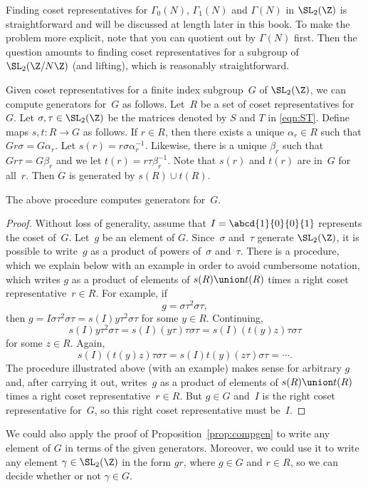 Finding coset representatives for $\Gamma_0(N)$, $\Gamma_1(N)$ and
$\Gamma(N)$ in $\SL_2(\Z)$ is straightforward and will be discussed
at length later in this book. To make the problem more explicit, note
that you can quotient out by $\Gamma(N)$ first. Then the question
amounts to finding coset representatives for a subgroup of
$\SL_2(\Z/N\Z)$ (and lifting), which is reasonably straightforward.

Given coset representatives for a finite index subgroup~$G$ of
$\SL_2(\Z)$, we can compute generators for~$G$ as follows.  Let~$R$ be
a set of coset representatives for $G$.  Let $\sigma, \tau \in
\SL_2(\Z)$ be the matrices denoted by $S$ and $T$ in \eqref{eqn:ST}.
Define maps $s, t: R \to G$ as follows. If $r \in R$, then there
exists a unique $\alpha_r \in R$ such that $Gr\sigma = G\alpha_r$.
Let $s(r) = r\sigma \alpha_r^{-1}$. Likewise, there is a unique
$\beta_r$ such that $Gr\tau = G\beta_r$ and we let $t(r) = r\tau
\beta_r^{-1}$. Note that $s(r)$ and $t(r)$ are in~$G$ for all~$r$.
Then $G$ is generated by $s(R)\cup t(R)$.

\begin{proposition}\label{prop:compgen}
The above procedure computes generators for~$G$.
\end{proposition}
\begin{proof}
  Without loss of generality, assume that $I=\abcd{1}{0}{0}{1}$
  represents the coset of~$G$.  Let~$g$ be an element of $G$.
  Since~$\sigma$ and~$\tau$ generate $\SL_2(\Z)$, it is possible to
  write~$g$ as a product of powers of~$\sigma$ and~$\tau$.  There is a
  procedure, which we explain below with an example in order to avoid
  cumbersome notation, which writes $g$ as a product of elements of
  $s(R) \union t(R)$ times a right coset representative~$r\in R$.  For
  example, if
$$g = \sigma \tau^2 \sigma \tau,$$
then $g=I\sigma \tau^2\sigma \tau = s(I)y\tau^2\sigma\tau$ 
for some $y \in R$.  Continuing, 
 $$s(I)y\tau^2\sigma\tau = s(I)(y\tau)\tau\sigma\tau 
= s(I)(t(y)z)\tau\sigma\tau$$ 
for some $z \in R$.  Again, 
$$s(I)(t(y)z)\tau\sigma\tau = s(I)t(y)(z\tau)\sigma\tau 
       = \cdots.
$$
The procedure illustrated above (with an example) makes sense for
arbitrary $g$ and, after carrying it out, writes~$g$ as a product of
elements of $s(R) \union t(R)$ times a right coset
representative~$r\in R$.  But $g\in G$ and~$I$ is the right coset
representative for~$G$, so this right coset representative must
be~$I$.
\end{proof}
\begin{remark}
We could also apply the proof of Proposition~\ref{prop:compgen} to
write any element of $G$ in terms of the given generators.
Moreover, we could use it to write any element $\gamma \in \SL_2(\Z)$
in the form $gr$, where $g\in G$ and $r\in R$, so we can decide
whether or not $\gamma \in G$.
\end{remark}

